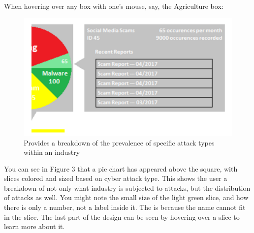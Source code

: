 \documentclass[journal]{vgtc}                %
\begin{document}
When hovering over any box with one’s mouse, say, the Agriculture box:
\begin{figure}[tb]
 \centering %
 \includegraphics[width=\columnwidth]{Design2}
 \caption{Provides a breakdown of the prevalence of specific attack types within an industry}
 \label{fig:sample}
\end{figure}
You can see in Figure 3 that a pie chart has appeared above the square, with slices colored and sized based on cyber attack type. 
This shows the user a breakdown of not only what industry is subjected to attacks, but the distribution of attacks as well.
You might note the small size of the light green slice, and how there is only a number, not a label inside it. 
The is because the name cannot fit in the slice. 
The last part of the design can be seen by hovering over a slice to learn more about it.
\end{document}
